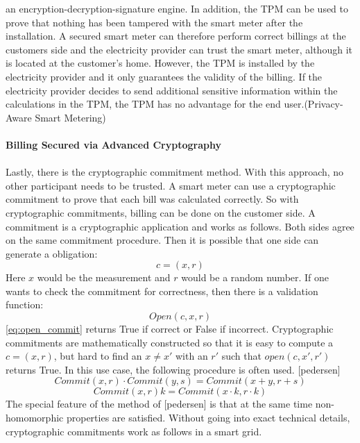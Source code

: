 an encryption-decryption-signature engine. In addition, the TPM can be used to prove that nothing has been tampered with the smart meter after the installation. A secured smart meter can therefore perform correct billings at the customers side and the electricity provider can trust the smart meter, although it is located at the customer's home. However, the TPM is installed by the electricity provider and it only guarantees the validity of the billing. If the electricity provider decides to send additional sensitive information within the calculations in the TPM, the TPM has no advantage for the end user.(Privacy-Aware Smart Metering)\\
\\
\textbf{Billing Secured via Advanced Cryptography}
\\
\\
Lastly, there is the cryptographic commitment method.
With this approach, no other participant needs to be trusted. A smart meter can use a cryptographic commitment to prove that each bill was calculated correctly. So with cryptographic commitments, billing can be done on the customer side. A commitment is a cryptographic application and works as follows. Both sides agree on the same commitment procedure. Then it is possible that one side can generate a obligation:\begin{equation}
\label{eq:commitment}
c=(x,r)
\end{equation} 
Here $x$ would be the measurement and $r$ would be a random number. If one wants to check the commitment for correctness, then there is a validation function:
\begin{equation}
\label{eq:open_commit}
Open(c,x,r)
\end{equation} 
\ref{eq:open_commit} returns True if correct or False if incorrect.
Cryptographic commitments are mathematically constructed so that it is easy to compute a $c=(x,r)$, but hard to find an $x \neq x'$ with an $r'$ such that $open(c,x',r')$ returns True. In this use case, the following procedure is often used. [pedersen] \\
\begin{equation}
\label{eq:homomorph1}
Commit(x, r) \cdot Commit(y, s) = Commit(x+y, r+s)
\end{equation} 
\begin{equation}
\label{eq:homomorph2}
Commit(x, r){k} = Commit(x \cdot k, r \cdot k)
\end{equation} 
The special feature of the method of [pedersen] is that at the same time non-homomorphic properties are satisfied. Without going into exact technical details, cryptographic commitments work as follows in a smart grid.\\
